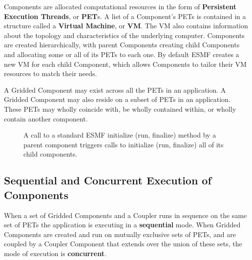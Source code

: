 Components are allocated computational resources in the form of
{\bf Persistent Execution Threads}, or {\bf PET}s.  A list of a Component's
PETs is contained in a structure called a {\bf Virtual Machine},
or {\bf VM}.  The VM also contains information about the topology and
characteristics of the underlying computer.
Components are created hierarchically, with parent Components creating
child Components and allocating some or all of its PETs to each one.
By default ESMF creates a new VM for each child Component, which 
allows Components to tailor their VM resources to match their needs.

A Gridded Component may exist across all the PETs in an application. 
A Gridded Component may also reside on a subset of PETs in an
application.  These PETs may wholly coincide with, be wholly contained
within, or wholly contain another component.

\begin{center}
\begin{figure}
\caption{A call to a standard ESMF initialize (run, finalize) method
by a parent component triggers calls to initialize (run, finalize)
all of its child components.}
\label{fig:appunit}
\end{figure}
\end{center}

\subsection{Sequential and Concurrent Execution of Components}
\label{sec:concurrency}

When a set of Gridded Components and a Coupler runs in sequence
on the same set of PETs the application is executing in a {\bf sequential}
mode. When Gridded Components are created and run on mutually exclusive
sets of PETs, and are coupled by a Coupler Component that extends over
the union of these sets, the mode of execution is {\bf concurrent}.

